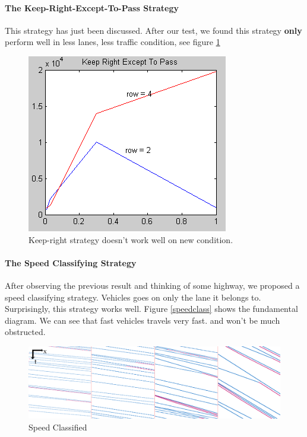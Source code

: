 \paragraph{The Keep-Right-Except-To-Pass Strategy}
This strategy has just been discussed. 
After our test, we found this strategy \textbf{only} perform well in less lanes, less traffic condition, see figure \ref{fig:graphkeepright}
\begin{figure}[H]
  \centering
  \includegraphics[width=.6\textwidth]{./img/graphkeepright.png}
  \caption{Keep-right strategy doesn't work well on new condition. }
  \label{fig:graphkeepright}
\end{figure}
\paragraph{The Speed Classifying Strategy}
After observing the previous result and thinking of some highway, we proposed a speed classifying strategy. 
Vehicles goes on only the lane it belongs to. 
Surprisingly, this strategy works well. 
Figure \ref{speedclass} shows the fundamental diagram. We can see that fast vehicles travels very fast. and won't be much obstructed. 
\begin{figure}[H]
  \centering
  \includegraphics[width=.6\textwidth]{./img/speedclass.png}
  \caption{Speed Classified}
  \label{fig:speedclass}
\end{figure}

